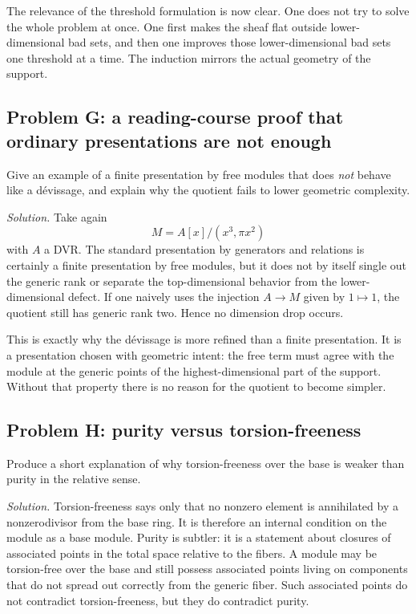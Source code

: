 \documentclass[11pt,oneside]{article}
\begin{document}
The relevance of the threshold formulation is now clear.  One does not try to solve the whole problem at once.  One first makes the sheaf flat outside lower-dimensional bad sets, and then one improves those lower-dimensional bad sets one threshold at a time.  The induction mirrors the actual geometry of the support.

\subsection*{Problem G: a reading-course proof that ordinary presentations are not enough}

Give an example of a finite presentation by free modules that does \emph{not} behave like a d\'evissage, and explain why the quotient fails to lower geometric complexity.

\emph{Solution.}  Take again
\[
M=A[x]/(x^3,\pi x^2)
\]
with $A$ a DVR.  The standard presentation by generators and relations is certainly a finite presentation by free modules, but it does not by itself single out the generic rank or separate the top-dimensional behavior from the lower-dimensional defect.  If one naively uses the injection $A\to M$ given by $1\mapsto 1$, the quotient still has generic rank two.  Hence no dimension drop occurs.

This is exactly why the d\'evissage is more refined than a finite presentation.  It is a presentation chosen with geometric intent: the free term must agree with the module at the generic points of the highest-dimensional part of the support.  Without that property there is no reason for the quotient to become simpler.

\subsection*{Problem H: purity versus torsion-freeness}

Produce a short explanation of why torsion-freeness over the base is weaker than purity in the relative sense.

\emph{Solution.}  Torsion-freeness says only that no nonzero element is annihilated by a nonzerodivisor from the base ring.  It is therefore an internal condition on the module as a base module.  Purity is subtler: it is a statement about closures of associated points in the total space relative to the fibers.  A module may be torsion-free over the base and still possess associated points living on components that do not spread out correctly from the generic fiber.  Such associated points do not contradict torsion-freeness, but they do contradict purity.
\end{document}
